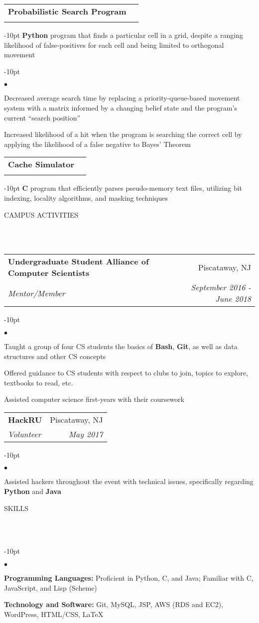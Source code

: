 \documentclass[12pt]{article}
\makeatletter
\newcommand{\lineunder}{
	\vspace*{-8pt} \\ 
	\hspace*{-18pt} 
	\hrulefill \\
}
\newcommand{\header}[1]{
	\vspace*{12pt}
	{\hspace*{-14pt}\vspace*{6pt} #1} %
	\vspace*{-6pt} 
	\lineunder
}
\newenvironment{achievements}{
\begin{adjustwidth}{-10pt}{}
  \begin{list}{$\bullet$}{
  	\topsep 0pt \itemsep -4pt}}
  	{\vspace*{2pt}\end{list}
\end{adjustwidth}
}
\def\cpp{
	{\hspace{-0.25em}C\nolinebreak[4]\hspace{-.05em}\raisebox{.4ex}{\tiny		\bf ++}}}
\newcommand{\subheading}[4]{
 	\vspace{5pt}
    	\begin{tabular*}{1.01\textwidth}
    		{l@{\extracolsep{\fill}}r}
      		\hspace{-16pt}\textbf{#1} & #2 \\
      		\hspace{-16pt}\textit{\small#3} & \textit{\small #4} \\
    	\end{tabular*}
    \vspace{-4pt}
}
\makeatother
\begin{document}
\subheading{Probabilistic Search Program}{}{}{}
	\vspace{-15pt}	
	\begin{adjustwidth}{-10pt}{}
	\textbf{Python} program that finds a particular cell in a grid, despite a ranging likelihood of false-positives for each cell and being limited to orthogonal movement
	\end{adjustwidth}
	\begin{achievements}
		\item Decreased average search time by replacing a priority-queue-based movement system with a matrix informed by a changing belief state and the program's current \textquotedblleft search position\textquotedblright
		\item Increased likelihood of a hit when the program is searching the correct cell by applying the likelihood of a false negative to Bayes' Theorem
	\end{achievements}
	
\subheading{Cache Simulator}{}{}{}
	\vspace{-15pt}
	\begin{adjustwidth}{-10pt}{}
	\textbf{C} program that efficiently parses pseudo-memory text files, utilizing bit indexing, locality algorithms, and masking techniques
	\end{adjustwidth}
\vspace*{4pt}


\header{CAMPUS ACTIVITIES}

\subheading
	{Undergraduate Student Alliance of Computer Scientists}{Piscataway, NJ}
	{Mentor/Member}{September 2016 - June 2018}
	\begin{achievements}
		\item Taught a group of four CS students the basics of \textbf{Bash}, \textbf{Git}, as well as data structures and other CS concepts
		\item Offered guidance to CS students with respect to clubs to join, topics to explore, textbooks to read, etc.
		\item Assisted computer science first-years with their coursework
	\end{achievements}
	
\subheading
	{HackRU}{Piscataway, NJ}
	{Volunteer}{May 2017}
	\begin{achievements}
		\item Assisted hackers throughout the event with technical issues, specifically regarding \textbf{Python} and \textbf{Java}
	\end{achievements}

	
\header{SKILLS}
	\begin{achievements}
		\item{\bf Programming Languages:} Proficient in Python, C, and Java; Familiar with \cpp, JavaScript, and Lisp (Scheme)
		\item{\bf Technology and Software:} Git, MySQL, JSP, AWS (RDS and EC2), WordPress, HTML/CSS, \LaTeX
	\end{achievements}
\end{document}

